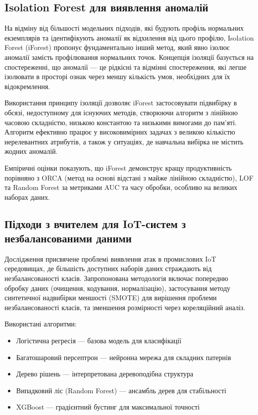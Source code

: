\subsection{Isolation Forest для виявлення аномалій}

На відміну від більшості модельних підходів, які будують профіль нормальних екземплярів та ідентифікують аномалії як відхилення від цього профілю, Isolation Forest (iForest) \cite{liu2008isolation} пропонує фундаментально інший метод, який явно ізолює аномалії замість профілювання нормальних точок. Концепція ізоляції базується на спостереженні, що аномалії --- це рідкісні та відмінні спостереження, які легше ізолювати в просторі ознак через меншу кількість умов, необхідних для їх відокремлення.

 Використання принципу ізоляції дозволяє iForest застосовувати підвибірку в обсязі, недоступному для існуючих методів, створюючи алгоритм з лінійною часовою складністю, низькою константою та низькими вимогами до пам'яті. Алгоритм ефективно працює у високовимірних задачах з великою кількістю нерелевантних атрибутів, а також у ситуаціях, де навчальна вибірка не містить жодних аномалій.

Емпіричні оцінки показують, що iForest демонструє кращу продуктивність порівняно з ORCA (метод на основі відстані з майже лінійною складністю), LOF та Random Forest за метриками AUC та часу обробки, особливо на великих наборах даних.

\subsection{Підходи з вчителем для IoT-систем з незбалансованими даними}

Дослідження \cite{doghramachi2023internet} присвячене проблемі виявлення атак в промислових IoT середовищах, де більшість доступних наборів даних страждають від незбалансованості класів. Запропонована методологія включає попередню обробку даних (очищення, кодування, нормалізацію), застосування методу синтетичної надвибірки меншості (SMOTE) для вирішення проблеми незбалансованості класів, та зменшення розмірності через кореляційний аналіз.

Використані алгоритми:
\begin{itemize}
\item Логістична регресія --- базова модель для класифікації
\item Багатошаровий персептрон --- нейронна мережа для складних патернів
\item Дерево рішень --- інтерпретована деревоподібна структура
\item Випадковий ліс (Random Forest) --- ансамбль дерев для стабільності
\item XGBoost --- градієнтний бустинг для максимальної точності
\end{itemize}

